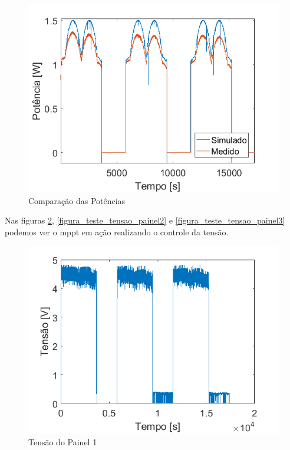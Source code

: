 \begin{figure}[!htpb]
\begin{center}
\includegraphics[scale=0.5]{figures/powerComparison.png}
\caption{Comparação das Potências}
\label{figura_potencia_comaracao}
\end{center}
\end{figure}

Nas figuras \ref{figura_teste_tensao_painel1}, \ref{figura_teste_tensao_painel2} e \ref{figura_teste_tensao_painel3} podemos ver o \gls{mppt} em ação realizando o controle da tensão.

\begin{figure}[!htpb]
\begin{center}
\includegraphics[scale=0.5]{figures/testPanel1Voltage.png}
\caption{Tensão do Painel 1}
\label{figura_teste_tensao_painel1}
\end{center}
\end{figure}

